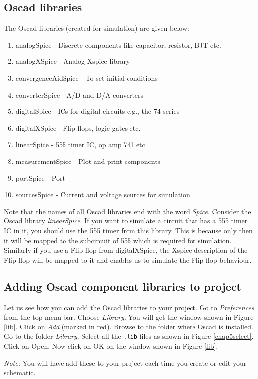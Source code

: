 \subsection{Oscad libraries}
The Oscad libraries (created for simulation) are given below:
\begin{enumerate}
\item analogSpice - Discrete components like capacitor, resistor, BJT etc.
\item analogXSpice - Analog Xspice library
\item convergenceAidSpice - To set initial conditions
\item converterSpice - A/D and D/A converters
\item digitalSpice - ICs for digital circuits e.g., the 74 series
\item digitalXSpice - Flip-flops, logic gates etc.
\item linearSpice - 555 timer IC, op amp 741 etc
\item measurementSpice - Plot and print components
\item portSpice - Port
\item sourcesSpice - Current and voltage sources for simulation
\end{enumerate}
Note that the names of all Oscad libraries end with the word \textit{Spice}. Consider the Oscad library \textit{linearSpice}. If you want to simulate a circuit that has a 555 timer IC in it, you should use the 555 timer from this library. This is because only then it will be mapped to the subcircuit of 555 which is required for simulation. Similarly if you use a Flip flop from digitalXSpice, the Xspice description of the Flip flop will be mapped to it and enables us to simulate the Flip flop behaviour.
\subsection{Adding Oscad component libraries to project}
\label{add}
Let us see how you can add the Oscad libraries to your project. Go to \textit{Preferences} from the top menu bar. Choose \textit{Library}. You will get the window shown in Figure \ref{lib}. Click on \textit{Add} (marked in red). Browse to the folder where Oscad is installed. Go to the folder \textit{Library}. Select all the {\tt *.lib} files as shown in Figure \ref{chap5select}. Click on Open. Now click on OK on the window shown in Figure \ref{lib}. 

\textit{Note:} You will have add these to your project each time you create or edit your schematic.

